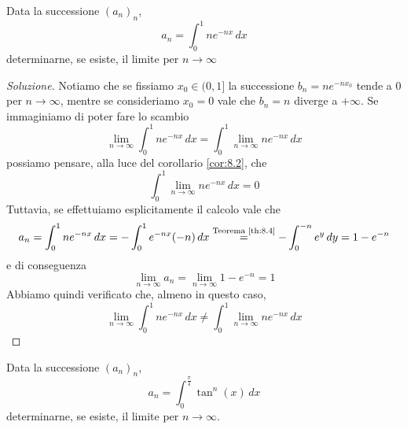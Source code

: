 \begin{exercise}
    \label{ex:9.4}
    Data la successione $(a_n)_n$, 
    \[
    a_n = \int_0^1 n e^{-nx}\, dx
    \]
    determinarne, se esiste, il limite per $n\to\infty$
\end{exercise}
\begin{proof}[Soluzione]
    Notiamo che se fissiamo $x_0\in(0,1]$ la successione $b_n = ne^{-nx_0} $ tende a 0 per $n\to \infty$, mentre se consideriamo $x_0=0$ vale che $b_n = n $ diverge a $+\infty$. Se immaginiamo di poter fare lo scambio
    \[
    \lim_{n\to\infty}\int_0^1 ne^{-nx}\, dx = \int_0^1 \lim_{n\to \infty} ne^{-nx}\, dx
    \]
    possiamo pensare, alla luce del corollario \ref{cor:8.2}, che 
    \[
    \int_0^1 \lim_{n\to \infty} ne^{-nx}\, dx = 0
    \]
    Tuttavia, se effettuiamo esplicitamente il calcolo vale che
    \[
    a_n = \int_0^1 ne^{-nx}\, dx = -\int_0^1 e^{-nx}(-n)\, dx \overset{\text{Teorema \ref{th:8.4}}}{=} -\int_0^{-n} e^{y}\, dy = 1-e^{-n}  
    \]
    e di conseguenza
    \[
    \lim_{n\to\infty} a_n = \lim_{n\to\infty}1-e^{-n} = 1
    \]
    Abbiamo quindi verificato che, almeno in questo caso, 
    \[
    \lim_{n\to\infty}\int_0^1 ne^{-nx}\, dx \ne \int_0^1 \lim_{n\to \infty} ne^{-nx}\, dx
    \]
\end{proof}
\begin{exercise}
    \label{ex:9.5}
    Data la successione $(a_n)_n$,
    \[
    a_n = \int_0^{\frac{\pi}{4}} \tan^n(x)\, dx
    \]
    determinarne, se esiste, il limite per $n\to\infty$.
\end{exercise}
